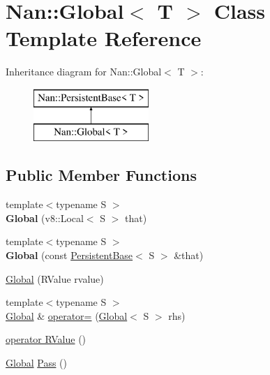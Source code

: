 \hypertarget{class_nan_1_1_global}{}\section{Nan\+:\+:Global$<$ T $>$ Class Template Reference}
\label{class_nan_1_1_global}
Inheritance diagram for Nan\+:\+:Global$<$ T $>$\+:\begin{figure}[H]
\begin{center}
\leavevmode
\includegraphics[height=2.000000cm]{class_nan_1_1_global}
\end{center}
\end{figure}
\subsection*{Public Member Functions}
\begin{DoxyCompactItemize}
\item 
\mbox{\label{class_nan_1_1_global_a27fc4a0d49d579f232661e62246044d1}} 
{\footnotesize template$<$typename S $>$ }\\{\bfseries Global} (v8\+::\+Local$<$ S $>$ that)
\item 
\mbox{\label{class_nan_1_1_global_ad333e9c588ec74bbc281bfa2c99721f8}} 
{\footnotesize template$<$typename S $>$ }\\{\bfseries Global} (const \hyperlink{class_nan_1_1_persistent_base}{Persistent\+Base}$<$ S $>$ \&that)
\item 
\hyperlink{class_nan_1_1_global_a333bda56d4a0c97928ab377e8accb51c}{Global} (R\+Value rvalue)
\item 
{\footnotesize template$<$typename S $>$ }\\\hyperlink{class_nan_1_1_global}{Global} \& \hyperlink{class_nan_1_1_global_ab2b5b4b01bce780eadee83d79baaa89b}{operator=} (\hyperlink{class_nan_1_1_global}{Global}$<$ S $>$ rhs)
\item 
\hyperlink{class_nan_1_1_global_a87f389eddb5684135f0614146d6e2cbc}{operator R\+Value} ()
\item 
\hyperlink{class_nan_1_1_global}{Global} \hyperlink{class_nan_1_1_global_a175939847770ba36c56e18f26e46353c}{Pass} ()
\end{DoxyCompactItemize}
